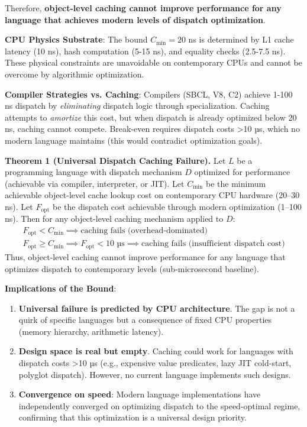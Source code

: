 \documentclass[sigplan,final,acmsmall,review,screen]{acmart}
\begin{document}
Therefore, \textbf{object-level caching cannot improve performance for any language that achieves modern levels of dispatch optimization}.

\textbf{CPU Physics Substrate}: The bound $C_{\text{min}} = 20$ ns is determined by L1 cache latency (10 ns), hash computation (5-15 ns), and equality checks (2.5-7.5 ns). These physical constraints are unavoidable on contemporary CPUs and cannot be overcome by algorithmic optimization.

\textbf{Compiler Strategies vs. Caching}: Compilers (SBCL, V8, C2) achieve 1-100 ns dispatch by \emph{eliminating} dispatch logic through specialization. Caching attempts to \emph{amortize} this cost, but when dispatch is already optimized below 20 ns, caching cannot compete. Break-even requires dispatch costs >10 µs, which no modern language maintains (this would contradict optimization goals).

\begin{boxedtheorem}
\textbf{Theorem 1 (Universal Dispatch Caching Failure).} Let $L$ be a programming language with dispatch mechanism $D$ optimized for performance (achievable via compiler, interpreter, or JIT). Let $C_{\min}$ be the minimum achievable object-level cache lookup cost on contemporary CPU hardware (20--30 ns). Let $F_{\text{opt}}$ be the dispatch cost achievable through modern optimization (1--100 ns). Then for any object-level caching mechanism applied to $D$:
\begin{align}
F_{\text{opt}} < C_{\min} \implies \text{caching fails (overhead-dominated)} \\
F_{\text{opt}} \geq C_{\min} \implies F_{\text{opt}} < 10 \text{ µs} \implies \text{caching fails (insufficient dispatch cost)}
\end{align}
Thus, object-level caching cannot improve performance for any language that optimizes dispatch to contemporary levels (sub-microsecond baseline).
\end{boxedtheorem}

\textbf{Implications of the Bound}:

\begin{enumerate}
  \item \textbf{Universal failure is predicted by CPU architecture}. The gap is not a quirk of specific languages but a consequence of fixed CPU properties (memory hierarchy, arithmetic latency).

  \item \textbf{Design space is real but empty}. Caching could work for languages with dispatch costs >10 µs (e.g., expensive value predicates, lazy JIT cold-start, polyglot dispatch). However, no current language implements such designs.

  \item \textbf{Convergence on speed}: Modern language implementations have independently converged on optimizing dispatch to the speed-optimal regime, confirming that this optimization is a universal design priority.
\end{enumerate}
\end{document}
